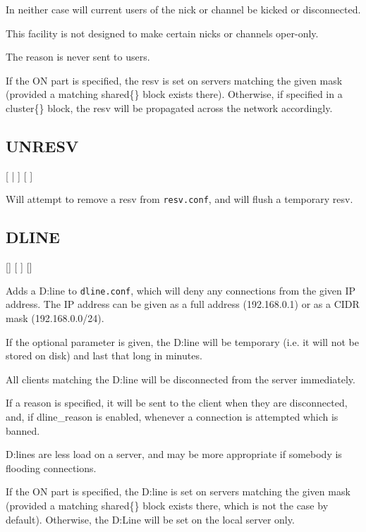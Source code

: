 	In neither case will current users of the nick or channel be kicked or
	disconnected.

	This facility is not designed to make certain nicks or channels
	oper-{}only.

	The reason is never sent to users.

	If the ON part is specified, the resv is set on servers matching the
	given mask (provided a matching shared\{\} block exists there).
	Otherwise, if specified in a cluster\{\} block, the resv will be
	propagated across the network accordingly.


\subsection{UNRESV}

    [ | ]
    [ ]

	Will attempt to remove a resv from \nolinkurl{resv.conf}, and will
	flush a temporary resv.


\subsection{DLINE}

    [] 
    [ ] [\literal{:}]

	Adds a D:line to \nolinkurl{dline.conf}, which will deny any
	connections from the given IP address. The IP address can be given as a
	full address (192.168.0.1) or as a CIDR mask (192.168.0.0\slash24).

	If the optional parameter  is given, the D:line
	will be temporary (i.e. it will not be stored on disk) and last that
	long in minutes.

	All clients matching the D:line will be disconnected from the server
	immediately.

	If a reason is specified, it will be sent to the client when they are
	disconnected, and, if dline\_reason is enabled, whenever a connection
	is attempted which is banned.

	D:lines are less load on a server, and may be more appropriate if
	somebody is flooding connections.


	If the ON part is specified, the D:line is set on servers matching the
	given mask (provided a matching shared\{\} block exists there, which is
	not the case by default). Otherwise, the D:Line will be set on the
	local server only.


